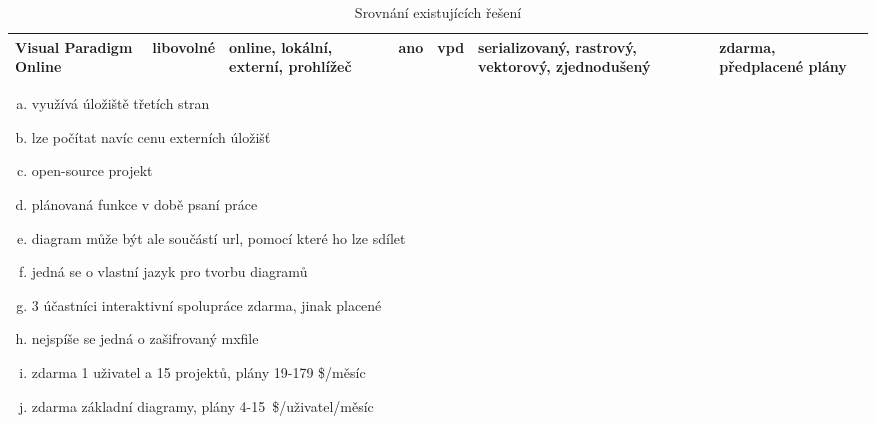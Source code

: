 \begin{table}[!htb]
\begin{center}
{\begin{tabular}{p{0.7in}lp{0.7in}p{0.7in}p{0.8in}p{0.8in}p{0.9in}}
        Visual \mbox{Paradigm} Online & libovolné    & online, \mbox{lokální}, \mbox{externí}, \mbox{prohlížeč} & ano\tnote{\ref{tab:gc:vpo-collab}}            & vpd\tnote{\ref{tab:gc:mxfile-like}}     & serializovaný, rastrový, vektorový, zjednodušený & zdarma, předplacené plány\tnote{\ref{tab:gc:price-vpo}}                    \\ \bottomrule
      \end{tabular}
    }
  \end{center}

  \footnotesize
  \begin{enumerate}[a.,ref = \alph*,noitemsep]
    \item využívá úložiště třetích stran \label{tab:gc:external-storage}
    \item lze počítat navíc cenu externích úložišť \label{tab:gc:price-external-storage}
    \item open-source projekt\label{tab:gc:open-source}
    \item plánovaná funkce v době psaní práce\label{tab:gc:plan}
    \item diagram může být ale součástí \acrshort{url}, pomocí které ho lze sdílet\label{tab:gc:in-url}
    \item jedná se o vlastní jazyk pro tvorbu diagramů\label{tab:gc:custom-lang}
    \item 3 účastníci interaktivní spolupráce zdarma, jinak placené\label{tab:gc:vpo-collab}
    \item nejspíše se jedná o zašifrovaný mxfile\label{tab:gc:mxfile-like}
    \item zdarma 1 uživatel a 15 projektů, plány 19-179 \$/měsíc\label{tab:gc:price-drawsql}
    \item zdarma základní diagramy, plány 4-15~\$/uživatel/měsíc\label{tab:gc:price-vpo}
  \end{enumerate}

  \caption{Srovnání existujících řešení}
  \label{tab:general-comparison}
\end{table}
